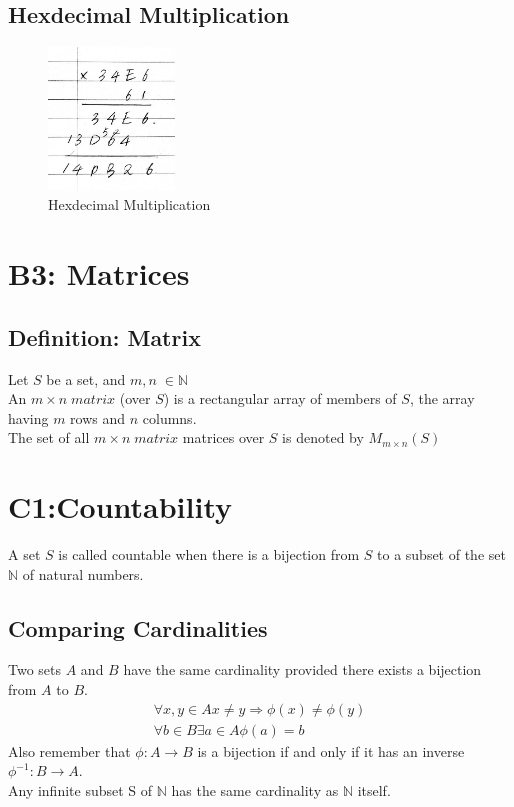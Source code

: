 \documentclass{article}
\begin{document}
\begin{spacing}{1.5}
\subsection{Hexdecimal Multiplication}
\begin{figure}[htb]
\centering 
\includegraphics[width=0.3\textwidth]{hexmul.jpg} %
\caption{Hexdecimal Multiplication} 
\end{figure}

\section{B3: Matrices}
\subsection{Definition: Matrix}
Let $S$ be a set, and $m,n \; \in \mathbb{N}  $\\
An $m \times n \; matrix $ (over $S$) is a rectangular array of members of $S$,
the array having $m$ rows and $n$ columns. \\
The set of all $m \times n \; matrix $ matrices over $S$ is denoted by $M_{m \times n}(S)$\\
\section{C1:Countability}
A set $S$ is called countable when there is a bijection from $S$ to  a subset of the set $\mathbb{N}$ of natural numbers. 
\subsection{Comparing Cardinalities}
Two sets $A$ and $B$ have the same cardinality provided there exists a bijection from $A$ to $B$.
\begin{align}
    \forall x,y \in A x \neq y \Rightarrow \phi (x) \neq \phi (y)\\
    \forall b \in B \exists a \in A \phi (a) = b 
\end{align}
Also remember that $\phi : A \rightarrow B$ is a bijection if and only if it has an inverse $\phi^{-1} : B \rightarrow A$.\\
Any infinite subset S of $\mathbb{N}$ has the same cardinality as $\mathbb{N}$ itself.

\end{spacing}
\end{document}
